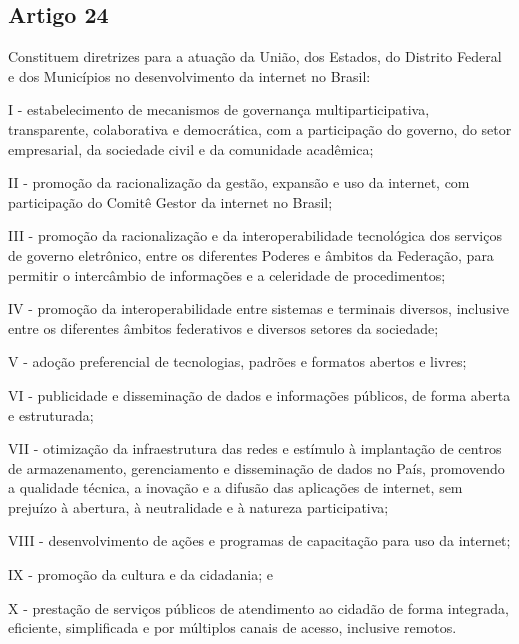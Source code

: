 \subsection{Artigo 24}
Constituem diretrizes para a atuação da União, dos Estados, do Distrito Federal e dos Municípios no desenvolvimento da internet no Brasil:

I - estabelecimento de mecanismos de governança multiparticipativa, transparente, colaborativa e democrática, com a participação do governo, do setor empresarial, da sociedade civil e da comunidade acadêmica;

II - promoção da racionalização da gestão, expansão e uso da internet, com participação do Comitê Gestor da internet no Brasil;

III - promoção da racionalização e da interoperabilidade tecnológica dos serviços de governo eletrônico, entre os diferentes Poderes e âmbitos da Federação, para permitir o intercâmbio de informações e a celeridade de procedimentos;

IV - promoção da interoperabilidade entre sistemas e terminais diversos, inclusive entre os diferentes âmbitos federativos e diversos setores da sociedade;

V - adoção preferencial de tecnologias, padrões e formatos abertos e livres;

VI - publicidade e disseminação de dados e informações públicos, de forma aberta e estruturada;

VII - otimização da infraestrutura das redes e estímulo à implantação de centros de armazenamento, gerenciamento e disseminação de dados no País, promovendo a qualidade técnica, a inovação e a difusão das aplicações de internet, sem prejuízo à abertura, à neutralidade e à natureza participativa;

VIII - desenvolvimento de ações e programas de capacitação para uso da internet;

IX - promoção da cultura e da cidadania; e

X - prestação de serviços públicos de atendimento ao cidadão de forma integrada, eficiente, simplificada e por múltiplos canais de acesso, inclusive remotos.